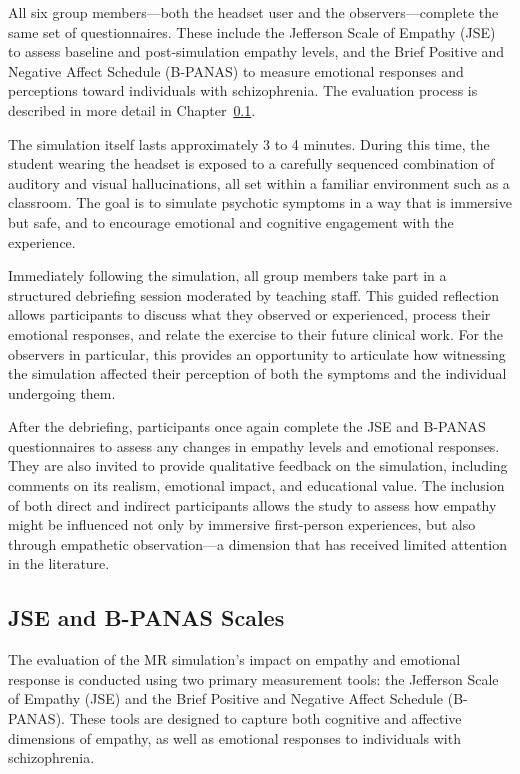 All six group members—both the headset user and the observers—complete the same set of questionnaires. These include the Jefferson Scale of Empathy (JSE) \cite{Hojat2002} to assess baseline and post-simulation empathy levels, and the Brief Positive and Negative Affect Schedule (B-PANAS) \cite{Boiroux2024} to measure emotional responses and perceptions toward individuals with schizophrenia. The evaluation process is described in more detail in Chapter~\ref{ch:eval}.

The simulation itself lasts approximately 3 to 4 minutes. During this time, the student wearing the headset is exposed to a carefully sequenced combination of auditory and visual hallucinations, all set within a familiar environment such as a classroom. The goal is to simulate psychotic symptoms in a way that is immersive but safe, and to encourage emotional and cognitive engagement with the experience.

Immediately following the simulation, all group members take part in a structured debriefing session moderated by teaching staff. This guided reflection allows participants to discuss what they observed or experienced, process their emotional responses, and relate the exercise to their future clinical work. For the observers in particular, this provides an opportunity to articulate how witnessing the simulation affected their perception of both the symptoms and the individual undergoing them.

After the debriefing, participants once again complete the JSE and B-PANAS questionnaires to assess any changes in empathy levels and emotional responses. They are also invited to provide qualitative feedback on the simulation, including comments on its realism, emotional impact, and educational value. The inclusion of both direct and indirect participants allows the study to assess how empathy might be influenced not only by immersive first-person experiences, but also through empathetic observation—a dimension that has received limited attention in the literature.


\subsection{JSE and B-PANAS Scales}
\label{ch:eval}
The evaluation of the MR simulation's impact on empathy and emotional response is conducted using two primary measurement tools: the Jefferson Scale of Empathy (JSE) and the Brief Positive and Negative Affect Schedule (B-PANAS). These tools are designed to capture both cognitive and affective dimensions of empathy, as well as emotional responses to individuals with schizophrenia.

